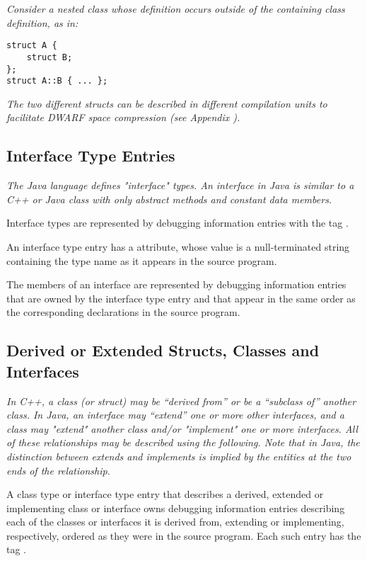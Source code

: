 \textit{Consider a nested class whose 
definition occurs outside of the containing class definition, as in:}

\begin{lstlisting}
struct A {
    struct B;
};
struct A::B { ... };
\end{lstlisting}

\textit{The two different structs can be described in 
different compilation units to 
facilitate DWARF space compression 
(see Appendix ).}

\subsection{Interface Type Entries}
\label{chap:interfacetypeentries}

\textit{The Java language defines "interface" types. An interface
in Java is similar to a C++ or Java class with only abstract
methods and constant data members.}

Interface types are represented by debugging information
entries with the 
tag .

An interface type entry has a  attribute, whose
value is a null-terminated string containing the type name
as it appears in the source program.

The members of an interface are represented by debugging
information entries that are owned by the interface type
entry and that appear in the same order as the corresponding
declarations in the source program.

\subsection{Derived or Extended Structs, Classes and Interfaces}
\label{chap:derivedorextendedstructsclasesandinterfaces}

\textit{In C++, a class (or struct) may be ``derived from'' or be a
``subclass of'' another class. In Java, an interface may ``extend''
one or more other interfaces, and a class may "extend" another
class and/or "implement" one or more interfaces. All of these
relationships may be described using the following. Note that
in Java, the distinction between extends and implements is
implied by the entities at the two ends of the relationship.}

A class type or interface type entry that describes a
derived, extended or implementing class or interface owns
debugging information entries describing each of the classes
or interfaces it is derived from, extending or implementing,
respectively, ordered as they were in the source program. Each
such entry has the 
tag .

